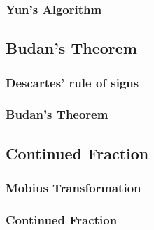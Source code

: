 \subsubsection{Yun's Algorithm}

\subsection{Budan's Theorem}

\subsubsection{Descartes' rule of signs}

\subsubsection{Budan's Theorem}

\subsection{Continued Fraction}

\subsubsection{Mobius Transformation}

\subsubsection{Continued Fraction}

